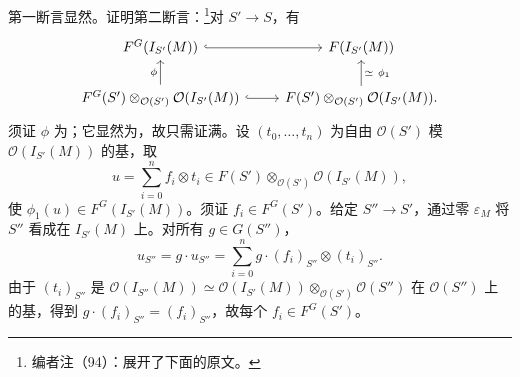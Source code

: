 第一断言显然。证明第二断言：\footnote{编者注（94）：展开了下面的原文。}对 $S'\to S$，有
\[\begin{tikzcd}
F^G(I_{S'}(M))\arrow[r,hook]&F(I_{S'}(M))\\
F^G(S')\otimes_{\mathcal O(S')}\mathcal O(I_{S'}(M))\arrow[u,"\phi"]\arrow[r,hook]&F(S')\otimes_{\mathcal O(S')}\mathcal O(I_{S'}(M))\arrow[u,"\simeq\ \phi_1"'].
\end{tikzcd}\]
须证 $\phi$ 为；它显然为，故只需证满。设 $(t_0,\ldots,t_n)$ 为自由 $\mathcal O(S')$ 模 $\mathcal O(I_{S'}(M))$ 的基，取
\[u=\sum_{i=0}^nf_i\otimes t_i\in F(S')\otimes_{\mathcal O(S')}\mathcal O(I_{S'}(M)),\]
使 $\phi_1(u)\in F^G(I_{S'}(M))$。须证 $f_i\in F^G(S')$。给定 $S''\to S'$，通过零 $\varepsilon_M$ 将 $S''$ 看成在 $I_{S'}(M)$ 上。对所有 $g\in G(S'')$，
\[u_{S''}=g\cdot u_{S''}=\sum_{i=0}^ng\cdot(f_i)_{S''}\otimes(t_i)_{S''}.\]
由于 $(t_i)_{S''}$ 是 $\mathcal O(I_{S''}(M))\simeq\mathcal O(I_{S'}(M))\otimes_{\mathcal O(S')}\mathcal O(S'')$ 在 $\mathcal O(S'')$ 上的基，得到 $g\cdot(f_i)_{S''}=(f_i)_{S''}$，故每个 $f_i\in F^G(S')$。

